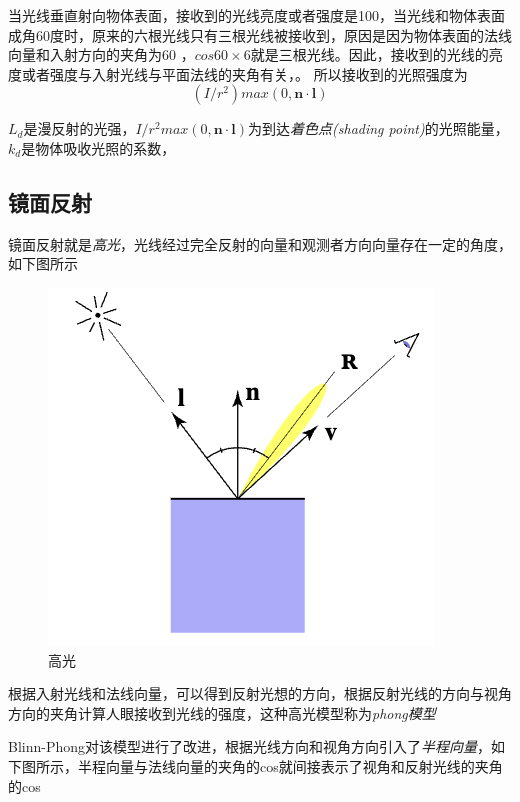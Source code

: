 当光线垂直射向物体表面，接收到的光线亮度或者强度是100，当光线和物体表面成角60度时，原来的六根光线只有三根光线被接收到，原因是因为物体表面的法线向量和入射方向的夹角为60
，$cos60\times6$就是三根光线。因此，接收到的光线的亮度或者强度与入射光线与平面法线的夹角有关，。
所以接收到的光照强度为
\begin{equation}
    (I/r^2)max(0,\mathbf{n}\cdot \mathbf{l})
\end{equation}


$L_d$是漫反射的光强，$I/r^2max(0,\mathbf{n}\cdot \mathbf{l})$为到达\textsl{着色点(shading point)}的光照能量，$k_d$是物体吸收光照的系数，

\subsection*{镜面反射}

镜面反射就是\textsl{高光}，光线经过完全反射的向量和观测者方向向量存在一定的角度，如下图所示

\begin{figure}[H]
    \centering
    \includegraphics[scale=0.45]{figures/高光.png}
    \caption[short]{高光}
\end{figure}

根据入射光线和法线向量，可以得到反射光想的方向，根据反射光线的方向与视角方向的夹角计算人眼接收到光线的强度，这种高光模型称为\textsl{phong模型}

Blinn-Phong对该模型进行了改进，根据光线方向和视角方向引入了\textsl{半程向量}，如下图所示，半程向量与法线向量的夹角的cos就间接表示了视角和反射光线的夹角的cos

